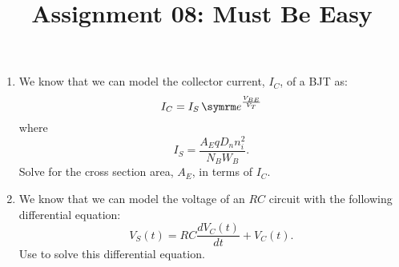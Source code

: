 \documentclass{article}
\title{Assignment 08: Must Be Easy}
\begin{document}
\renderTitle

\begin{enumerate}[leftmargin=*]
	\item
		We know that we can model the collector current,
		\(I_C\), of a BJT as:
		\begin{equation}
			I_C = I_S \, \e^{\frac{V_{BE}}{V_T}}
		\end{equation}
		where
		\begin{equation}
			I_S = \frac{A_E q D_n n_i^2}{N_B W_B}.
		\end{equation}
		Solve for the cross section area, \(A_E\), in terms of
		\(I_C\).

	\item
		We know that we can model the voltage of an \(RC\)
		circuit with the following differential equation:
		\begin{equation}
			V_S(t) = RC \frac{d V_C(t)}{dt} + V_C(t).
		\end{equation}
		Use  to solve this differential
		equation.
\end{enumerate}
\end{document}
